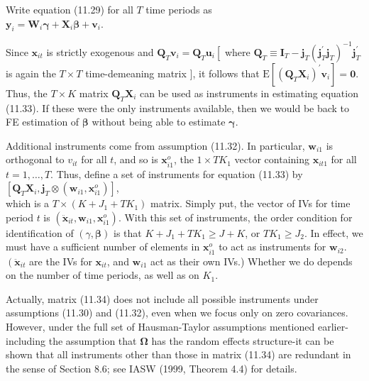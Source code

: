 \documentclass[10pt]{article}
\begin{document}
Write equation (11.29) for all $T$ time periods as\\
$\mathbf{y}_{i}=\mathbf{W}_{i} \boldsymbol{\gamma}+\mathbf{X}_{i} \boldsymbol{\beta}+\mathbf{v}_{i}$.

Since $\mathbf{x}_{i t}$ is strictly exogenous and $\mathbf{Q}_{T} \mathbf{v}_{i}=\mathbf{Q}_{T} \mathbf{u}_{i}\left[\right.$ where $\mathbf{Q}_{T} \equiv \mathbf{I}_{T}-\mathbf{j}_{T}\left(\mathbf{j}_{T}^{\prime} \mathbf{j}_{T}\right)^{-1} \mathbf{j}_{T}^{\prime}$ is again the $T \times T$ time-demeaning matrix $]$, it follows that $\mathrm{E}\left[\left(\mathbf{Q}_{T} \mathbf{X}_{i}\right)^{\prime} \mathbf{v}_{i}\right]=\mathbf{0}$. Thus, the $T \times K$ matrix $\mathbf{Q}_{T} \mathbf{X}_{i}$ can be used as instruments in estimating equation (11.33). If these were the only instruments available, then we would be back to FE estimation of $\boldsymbol{\beta}$ without being able to estimate $\boldsymbol{\gamma}$.

Additional instruments come from assumption (11.32). In particular, $\mathbf{w}_{i 1}$ is orthogonal to $v_{i t}$ for all $t$, and so is $\mathbf{x}_{i 1}^{o}$, the $1 \times T K_{1}$ vector containing $\mathbf{x}_{i t 1}$ for all $t=1, \ldots, T$. Thus, define a set of instruments for equation (11.33) by\\
$\left[\mathbf{Q}_{T} \mathbf{X}_{i}, \mathbf{j}_{T} \otimes\left(\mathbf{w}_{i 1}, \mathbf{x}_{i 1}^{o}\right)\right]$,\\
which is a $T \times\left(K+J_{1}+T K_{1}\right)$ matrix. Simply put, the vector of IVs for time period $t$ is $\left(\ddot{\mathbf{x}}_{i t}, \mathbf{w}_{i 1}, \mathbf{x}_{i 1}^{o}\right)$. With this set of instruments, the order condition for identification of $(\gamma, \boldsymbol{\beta})$ is that $K+J_{1}+T K_{1} \geq J+K$, or $T K_{1} \geq J_{2}$. In effect, we must have a sufficient number of elements in $\mathbf{x}_{i 1}^{o}$ to act as instruments for $\mathbf{w}_{i 2}$. $\left(\ddot{\mathbf{x}}_{i t}\right.$ are the IVs for $\mathbf{x}_{i t}$, and $\mathbf{w}_{i 1}$ act as their own IVs.) Whether we do depends on the number of time periods, as well as on $K_{1}$.

Actually, matrix (11.34) does not include all possible instruments under assumptions (11.30) and (11.32), even when we focus only on zero covariances. However, under the full set of Hausman-Taylor assumptions mentioned earlier-including the assumption that $\boldsymbol{\Omega}$ has the random effects structure-it can be shown that all instruments other than those in matrix (11.34) are redundant in the sense of Section 8.6; see IASW (1999, Theorem 4.4) for details.
\end{document}

